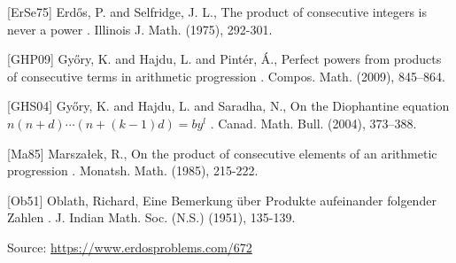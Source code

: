 \documentclass{article}
\begin{document}
[ErSe75] Erd\H{o}s, P. and Selfridge, J. L., The product of consecutive integers is never a power . Illinois J. Math. (1975), 292-301.

[GHP09] Gy\H ory, K. and Hajdu, L. and Pint\'er, \'A., Perfect powers from products of consecutive terms in arithmetic progression . Compos. Math. (2009), 845--864.

[GHS04] Gy\H ory, K. and Hajdu, L. and Saradha, N., On the {D}iophantine equation {$n(n+d)\cdots(n+(k-1)d)=by^l$} . Canad. Math. Bull. (2004), 373--388.

[Ma85] Marsza\l ek, R., On the product of consecutive elements of an arithmetic progression . Monatsh. Math. (1985), 215-222.

[Ob51] Oblath, Richard, Eine Bemerkung \"{u}ber Produkte aufeinander folgender Zahlen . J. Indian Math. Soc. (N.S.) (1951), 135-139.

\bigskip
\noindent\small{Source: \url{https://www.erdosproblems.com/672}}
\end{document}
